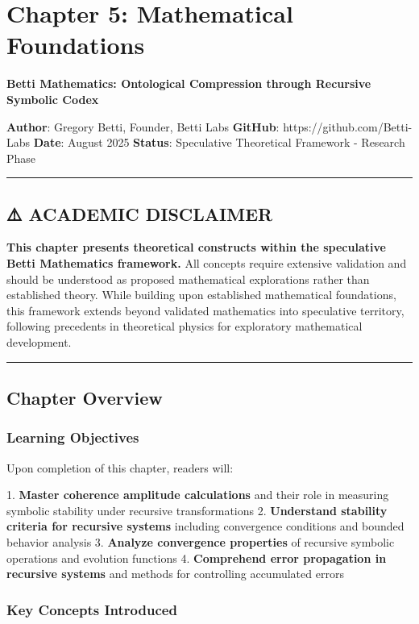 \chapter{Chapter 5: Mathematical Foundations}

\textbf{Betti Mathematics: Ontological Compression through Recursive Symbolic Codex}

\textbf{Author}: Gregory Betti, Founder, Betti Labs  
\textbf{GitHub}: https://github.com/Betti-Labs  
\textbf{Date}: August 2025  
\textbf{Status}: Speculative Theoretical Framework - Research Phase

\hrule

\section{⚠️ ACADEMIC DISCLAIMER}

\textbf{This chapter presents theoretical constructs within the speculative Betti Mathematics framework.} All concepts require extensive validation and should be understood as proposed mathematical explorations rather than established theory. While building upon established mathematical foundations, this framework extends beyond validated mathematics into speculative territory, following precedents in theoretical physics for exploratory mathematical development.

\hrule

\section{Chapter Overview}

\subsection{Learning Objectives}

Upon completion of this chapter, readers will:

1. \textbf{Master coherence amplitude calculations} and their role in measuring symbolic stability under recursive transformations
2. \textbf{Understand stability criteria for recursive systems} including convergence conditions and bounded behavior analysis
3. \textbf{Analyze convergence properties} of recursive symbolic operations and evolution functions
4. \textbf{Comprehend error propagation in recursive systems} and methods for controlling accumulated errors

\subsection{Key Concepts Introduced}

